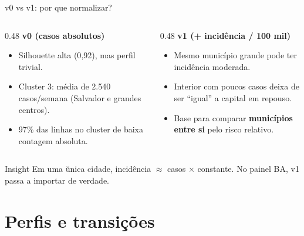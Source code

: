 \documentclass[aspectratio=169,xcolor=table]{beamer}
\begin{document}
\begin{frame}{v0 vs v1: por que normalizar?}
    \small
    \begin{columns}[T]
        \begin{column}{0.48\textwidth}
            \textbf{v0 (casos absolutos)}
            \begin{itemize}
                \item Silhouette alta (0{,}92), mas perfil trivial.
                \item Cluster 3: m\'edia de 2.540 casos/semana (Salvador e grandes centros).
                \item 97\% das linhas no cluster de baixa contagem absoluta.
            \end{itemize}
        \end{column}
        \begin{column}{0.48\textwidth}
            \textbf{v1 (+ incid\^encia / 100 mil)}
            \begin{itemize}
                \item Mesmo munic\'ipio grande pode ter incid\^encia moderada.
                \item Interior com poucos casos deixa de ser ``igual'' a capital em repouso.
                \item Base para comparar \textbf{munic\'ipios entre si} pelo risco relativo.
            \end{itemize}
        \end{column}
    \end{columns}

    \vspace{0.5em}
    \begin{block}{Insight}
        Em uma \u{u}nica cidade, incid\^encia $\approx$ casos $\times$ constante. No painel BA, v1 passa a importar de verdade.
    \end{block}
\end{frame}

\section{Perfis e transi\c{c}\~oes}
\sectionframe
\end{document}
